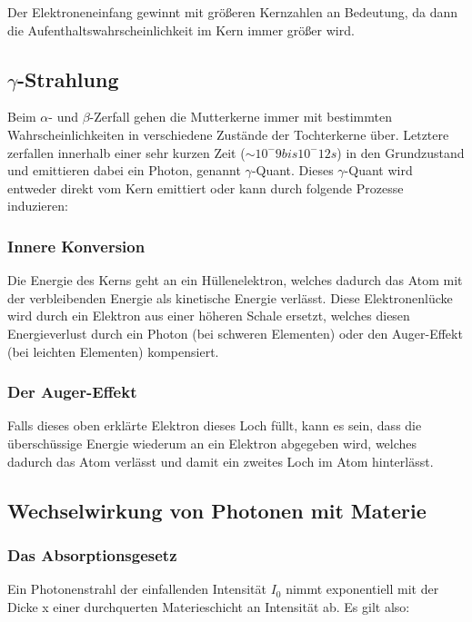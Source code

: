 Der Elektroneneinfang gewinnt mit größeren Kernzahlen an Bedeutung, da dann die Aufenthaltswahrscheinlichkeit im Kern immer größer wird.

\subsection{$\gamma$-Strahlung}

Beim $\alpha$- und $\beta$-Zerfall gehen die Mutterkerne immer mit bestimmten Wahrscheinlichkeiten in verschiedene Zustände der Tochterkerne über. Letztere zerfallen innerhalb einer sehr kurzen Zeit ($\sim 10^-9 bis 10^-12 s$) in den Grundzustand und emittieren dabei ein Photon, genannt $\gamma$-Quant. Dieses $\gamma$-Quant wird entweder direkt vom Kern emittiert oder kann durch folgende Prozesse induzieren:

\subsubsection{Innere Konversion}

Die Energie des Kerns geht an ein Hüllenelektron, welches dadurch das Atom mit der verbleibenden Energie als kinetische Energie verlässt. Diese Elektronenlücke wird durch ein Elektron aus einer höheren Schale ersetzt, welches diesen Energieverlust durch ein Photon (bei schweren Elementen) oder den Auger-Effekt (bei leichten Elementen) kompensiert.

\subsubsection{Der Auger-Effekt}

Falls dieses oben erklärte Elektron dieses Loch füllt, kann es sein, dass die überschüssige Energie wiederum an ein Elektron abgegeben wird, welches dadurch das Atom verlässt und damit ein zweites Loch im Atom hinterlässt.


\subsection{Wechselwirkung von Photonen mit Materie}

\subsubsection{Das Absorptionsgesetz}

Ein Photonenstrahl der einfallenden Intensität $I_0$ nimmt exponentiell mit der Dicke x einer durchquerten Materieschicht an Intensität ab. Es gilt also:

